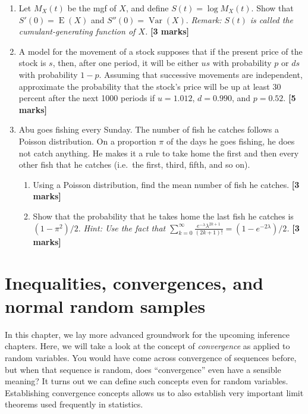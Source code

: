 \documentclass[
]{book}
\DeclareMathOperator{\E}{E}
\DeclareMathOperator{\Var}{Var}
\theoremstyle{definition}
\theoremstyle{definition}
\theoremstyle{definition}
\theoremstyle{definition}
\theoremstyle{remark}
\begin{document}
\begin{enumerate}
\def\labelenumi{\arabic{enumi}.}
\item
  Let \(M_X(t)\) be the mgf of \(X\), and define \(S(t) = \log M_X(t)\). Show that \(S'(0)= \E(X)\) and \(S''(0)= \Var(X)\). \emph{Remark: \(S(t)\) is called the cumulant-generating function of \(X\).} \textbf{{[}3 marks{]}}
\item
  A model for the movement of a stock supposes that if the present price of the stock is \(s\), then, after one period, it will be either \(us\) with probability \(p\) or \(ds\) with probability \(1-p\). Assuming that successive movements are independent, approximate the probability that the stock's price will be up at least 30 percent after the next 1000 periods if \(u = 1.012\), \(d = 0.990\), and \(p = 0.52\). \textbf{{[}5 marks{]}}
\item
  Abu goes fishing every Sunday. The number of fish he catches follows a Poisson distribution. On a proportion \(\pi\) of the days he goes fishing, he does not catch anything. He makes it a rule to take home the first and then every other fish that he catches (i.e.~the first, third, fifth, and so on).

  \begin{enumerate}
  \def\labelenumii{(\alph{enumii})}
  \item
    Using a Poisson distribution, find the mean number of fish he catches. \textbf{{[}3 marks{]}}
  \item
    Show that the probability that he takes home the last fish he catches is \((1-\pi^2)/2\). \emph{Hint: Use the fact that \(\sum_{k=0}^\infty\frac{e^{-\lambda}\lambda^{2k+1}}{(2k+1)!}=(1-e^{-2\lambda})/2\).} \textbf{{[}3 marks{]}}
  \end{enumerate}
\end{enumerate}

\hypertarget{inequalities-convergences-and-normal-random-samples}{%
\chapter{Inequalities, convergences, and normal random samples}\label{inequalities-convergences-and-normal-random-samples}}

In this chapter, we lay more advanced groundwork for the upcoming inference chapters.
Here, we will take a look at the concept of \emph{convergence} as applied to random variables.
You would have come across convergence of sequences before, but when that sequence is random, does ``convergence'' even have a sensible meaning?
It turns out we can define such concepts even for random variables.
Establishing convergence concepts allows us to also establish very important limit theorems used frequently in statistics.
\end{document}
